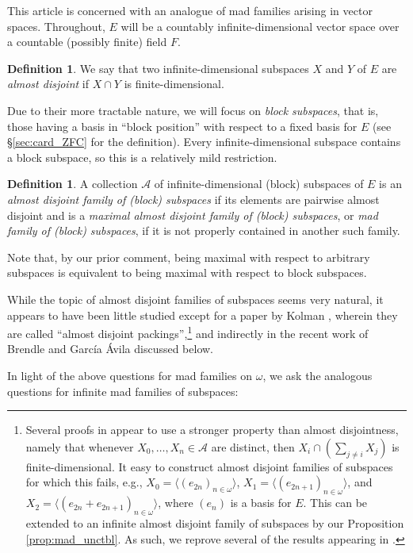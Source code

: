 \documentclass[11pt]{amsart}
\newcommand{\LA}{\mathcal{A}}
\theoremstyle{definition}
\newtheorem{defn}[thm]{Definition}
\theoremstyle{remark}
\renewcommand{\1}{\mathbf{1}}
\begin{document}
This article is concerned with an analogue of mad families arising in vector spaces. Throughout, $E$ will be a countably infinite-dimensional vector space over a countable (possibly finite) field $F$.

\begin{defn}
	We say that two infinite-dimensional subspaces $X$ and $Y$ of $E$ are \emph{almost disjoint} if $X\cap Y$ is finite-dimensional.	
\end{defn}

Due to their more tractable nature, we will focus on \emph{block subspaces}, that is, those having a basis in ``block position'' with respect to a fixed basis for $E$ (see \S\ref{sec:card_ZFC} for the definition). Every infinite-dimensional subspace contains a block subspace, so this is a relatively mild restriction.

\begin{defn}
	A collection $\LA$ of infinite-dimensional (block) subspaces of $E$ is an \emph{almost disjoint family of (block) subspaces} if its elements are pairwise almost disjoint and is a \emph{maximal almost disjoint family of (block) subspaces}, or \emph{mad family of (block) subspaces}, if it is not properly contained in another such family.
\end{defn}

Note that, by our prior comment, being maximal with respect to arbitrary subspaces is equivalent to being maximal with respect to block subspaces.

While the topic of almost disjoint families of subspaces seems very natural, it appears to have been little studied except for a paper by Kolman \cite{MR1756262}, wherein they are called ``almost disjoint packings'',\footnote{Several proofs in \cite{MR1756262} appear to use a stronger property than almost disjointness, namely that whenever $X_0,\ldots,X_n\in\LA$ are distinct, then $X_i\cap(\sum_{j\neq i}X_j)$ is finite-dimensional. It easy to construct almost disjoint families of subspaces for which this fails, e.g., $X_0=\langle(e_{2n})_{n\in\omega}\rangle$, $X_1=\langle(e_{2n+1})_{n\in\omega}\rangle$, and $X_2=\langle(e_{2n}+e_{2n+1})_{n\in\omega}\rangle$, where $(e_n)$ is a basis for $E$. This can be extended to an infinite almost disjoint family of subspaces by our Proposition \ref{prop:mad_unctbl}. As such, we reprove several of the results appearing in \cite{MR1756262}.} and indirectly in the recent work of Brendle and Garc\'{i}a \'{A}vila \cite{MR3685044} discussed below.

In light of the above questions for mad families on $\omega$, we ask the analogous questions for infinite mad families of subspaces:
\end{document}
